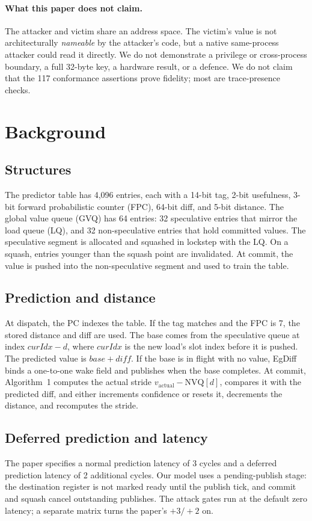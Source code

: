 \documentclass[conference]{IEEEtran}
\begin{document}
\paragraph{What this paper does not claim.}
The attacker and victim share an address space. The victim's value is
not architecturally \emph{nameable} by the attacker's code, but a native
same-process attacker could read it directly. We do not demonstrate a
privilege or cross-process boundary, a full 32-byte key, a hardware
result, or a defence. We do not claim that the 117 conformance
assertions prove fidelity; most are trace-presence checks.

\section{Background}

\subsection{Structures}
The predictor table has 4,096 entries, each with a 14-bit tag, 2-bit
usefulness, 3-bit forward probabilistic counter (FPC), 64-bit diff, and
5-bit distance. The global value queue (GVQ) has 64 entries: 32
speculative entries that mirror the load queue (LQ), and 32
non-speculative entries that hold committed values. The speculative
segment is allocated and squashed in lockstep with the LQ. On a squash,
entries younger than the squash point are invalidated. At commit, the
value is pushed into the non-speculative segment and used to train the
table.

\subsection{Prediction and distance}
At dispatch, the PC indexes the table. If the tag matches and the FPC is
7, the stored distance and diff are used. The base comes from the
speculative queue at index $\mathit{curIdx}-d$, where $\mathit{curIdx}$
is the new load's slot index before it is pushed. The predicted value is
$\mathit{base}+\mathit{diff}$. If the base is in flight with no value,
EgDiff binds a one-to-one wake field and publishes when the base
completes. At commit, Algorithm~1 computes the actual stride
$v_{\mathrm{actual}}-\mathrm{NVQ}[d]$, compares it with the predicted
diff, and either increments confidence or resets it, decrements the
distance, and recomputes the stride.

\subsection{Deferred prediction and latency}
The paper specifies a normal prediction latency of 3 cycles and a
deferred prediction latency of 2 additional cycles. Our model uses a
pending-publish stage: the destination register is not marked ready
until the publish tick, and commit and squash cancel outstanding
publishes. The attack gates run at the default zero latency; a separate
matrix turns the paper's $+3/+2$ on.
\end{document}

